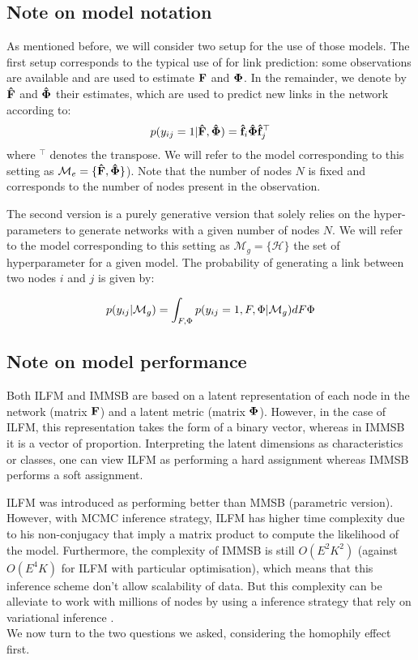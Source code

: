 \subsection{Note on model notation}
As mentioned before, we will consider two setup for the use of those models. The first setup corresponds to the typical use of for link prediction: some observations are available and are used to estimate $\mathbf{F}$ and $\mathbf{\Phi}$. In the remainder, we denote by $\mathbf{\hat{F}}$ and $\mathbf{\hat{\Phi}}$ their estimates, which are used to predict new links in the network according to:
%
\begin{equation}
\label{eq:link-me}
\pr(y_{ij}=1|\mat{\hat{F}},\mat{\hat{\Phi}}) =  \mat{\hat{f}}_{i} \mat{\hat{\Phi}} \mat{\hat{f}}_j^\top
\end{equation}
%
where $^\top$ denotes the transpose. We will refer to the model corresponding to this setting as $\mathcal{M}_e = \{\mathbf{\hat{F}},\mathbf{\hat{\Phi}}\}$). Note that the number of nodes $N$ is fixed and corresponds to the number of nodes present in the observation.

The second version is a purely generative version that solely relies on the hyper-parameters to generate networks with a given number of nodes $N$. We will refer to  the model corresponding to this setting as $\mathcal{M}_g = \{\mathcal H\}$ the set of hyperparameter for a given model. The probability of generating a link between  two nodes $i$ and $j$ is given by:
%

\begin{equation}
p(y_{ij} | \mathcal{M}_g) = \int_{F,\Phi} p(y_{ij}=1, F,\Phi |\mathcal{M}_g) dF\Phi
\end{equation}


\subsection{Note on model performance}

Both ILFM and IMMSB are based on a latent representation of each node in the network (matrix $\mathbf{F}$) and a latent metric (matrix $\mathbf{\Phi}$). However, in the case of ILFM, this representation takes the form of a binary vector, whereas in IMMSB it is a vector of proportion. Interpreting the latent dimensions as characteristics or classes, one can view ILFM as performing a hard assignment whereas IMMSB performs a soft assignment. 

ILFM was introduced as performing better than MMSB (parametric version). However, with MCMC inference strategy, ILFM has higher time complexity due to his non-conjugacy that imply a matrix product to compute the likelihood of the model. Furthermore, the complexity of IMMSB is still $O(E^2K^2)$ (against $O(E^4K)$ for ILFM with particular optimisation), which means that this inference scheme don't allow scalability of data. But this complexity can be alleviate to work with millions of nodes by using a inference strategy that rely on variational inference \cite{gopalan2013efficient}.\\

 We now turn to the two questions we asked, considering the homophily effect first.

